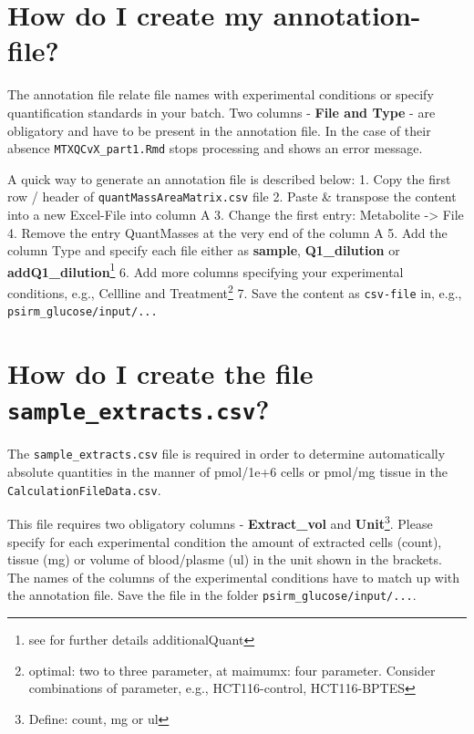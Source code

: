 \documentclass[]{book}
\let\rmarkdownfootnote\footnote%
\def\footnote{\protect\rmarkdownfootnote}
\theoremstyle{definition}
\theoremstyle{definition}
\theoremstyle{definition}
\theoremstyle{remark}
\begin{document}
\section{How do I create my annotation-file?}\label{createannotation}

The annotation file relate file names with experimental conditions or
specify quantification standards in your batch. Two columns -
\textbf{File and Type} - are obligatory and have to be present in the
annotation file. In the case of their absence
\texttt{MTXQCvX\_part1.Rmd} stops processing and shows an error message.

A quick way to generate an annotation file is described below: 1. Copy
the first row / header of \texttt{quantMassAreaMatrix.csv} file 2. Paste
\& transpose the content into a new Excel-File into column A 3. Change
the first entry: Metabolite -\textgreater{} File 4. Remove the entry
QuantMasses at the very end of the column A 5. Add the column Type and
specify each file either as \textbf{sample}, \textbf{Q1\_dilution} or
\textbf{addQ1\_dilution}\footnote{see for further details
  additionalQuant} 6. Add more columns specifying your experimental
conditions, e.g., Cellline and Treatment\footnote{optimal: two to three
  parameter, at maimumx: four parameter. Consider combinations of
  parameter, e.g., HCT116-control, HCT116-BPTES} 7. Save the content as
\texttt{csv-file} in, e.g., \texttt{psirm\_glucose/input/...}

\section{\texorpdfstring{How do I create the file
\texttt{sample\_extracts.csv}?}{How do I create the file sample\_extracts.csv?}}\label{createsampleextracts}

The \texttt{sample\_extracts.csv} file is required in order to determine
automatically absolute quantities in the manner of pmol/1e+6 cells or
pmol/mg tissue in the \texttt{CalculationFileData.csv}.

This file requires two obligatory columns - \textbf{Extract\_vol} and
\textbf{Unit}\footnote{Define: count, mg or ul}. Please specify for each
experimental condition the amount of extracted cells (count), tissue
(mg) or volume of blood/plasme (ul) in the unit shown in the brackets.\\
The names of the columns of the experimental conditions have to match up
with the annotation file. Save the file in the folder
\texttt{psirm\_glucose/input/...}.
\end{document}
